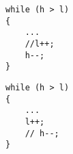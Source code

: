 
\noindent\begin{minipage}{.45\textwidth}
\begin{lstlisting}[style=CStyle, caption=Excerpt from mutant M4 of isPalindrome., label=redudantexample1]
while (h > l) 
{ 
	...
	//l++;
	h--;
}
\end{lstlisting}
\end{minipage}\hfill
\begin{minipage}{.45\textwidth}
\begin{lstlisting}[style=CStyle, caption=Excerpt from mutant M5 of isPalindrome., label=redudantexample2]
while (h > l) 
{ 
	...
	l++;
	// h--;
}
\end{lstlisting}
\end{minipage}